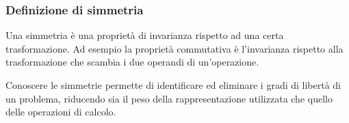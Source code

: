 \subsubsection*{Definizione di simmetria}
Una simmetria è una proprietà di invarianza rispetto ad una certa trasformazione. Ad esempio la proprietà commutativa è
l'invarianza rispetto alla trasformazione che scambia i due operandi di un'operazione.

Conoscere le simmetrie permette di identificare ed eliminare i gradi di libertà di un problema, riducendo sia il peso della
rappresentazione utilizzata che quello delle operazioni di calcolo.

